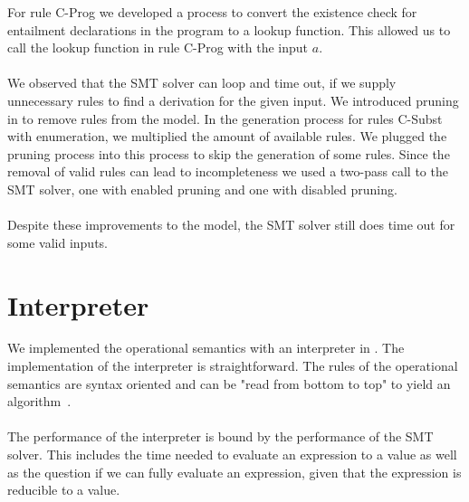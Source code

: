 For rule C-Prog we developed a process to convert the existence check for
entailment declarations in the program to a lookup function.
This allowed us to call the lookup function in rule C-Prog with the input $a$.\\
\\
We observed that the SMT solver can loop and time out,
if we supply unnecessary rules to find a derivation
for the given input.
We introduced pruning in  to
remove rules from the model.
In the generation process for rules C-Subst with enumeration,
we multiplied the amount of available rules.
We plugged the pruning process into this process
to skip the generation of some rules.
Since the removal of valid rules can lead to incompleteness
we used a two-pass call to the SMT solver,
one with enabled pruning and one with disabled pruning.\\
\\
Despite these improvements to the model,
the SMT solver still does time out
for some valid inputs.
%

\section{Interpreter}
We implemented the operational semantics with an interpreter in .
The implementation of the interpreter is straightforward.
The rules of the operational semantics are syntax oriented
and can be "read from bottom to top" to yield
an algorithm~\cite{tpl}.\\
\\
The performance of the interpreter is bound
by the performance of the SMT solver.
This includes the time needed to evaluate an expression to a value
as well as the question if we can fully evaluate an expression,
given that the expression is reducible to a value.
%

